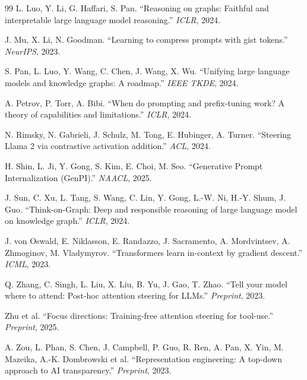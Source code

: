 \documentclass[11pt]{article}
\theoremstyle{definition}
\begin{document}
\begin{thebibliography}{99}
L. Luo, Y. Li, G. Haffari, S. Pan.
``Reasoning on graphs: Faithful and interpretable large language model reasoning.''
\emph{ICLR}, 2024.

J. Mu, X. Li, N. Goodman.
``Learning to compress prompts with gist tokens.''
\emph{NeurIPS}, 2023.

S. Pan, L. Luo, Y. Wang, C. Chen, J. Wang, X. Wu.
``Unifying large language models and knowledge graphs: A roadmap.''
\emph{IEEE TKDE}, 2024.

A. Petrov, P. Torr, A. Bibi.
``When do prompting and prefix-tuning work? A theory of capabilities and limitations.''
\emph{ICLR}, 2024.

N. Rimsky, N. Gabrieli, J. Schulz, M. Tong, E. Hubinger, A. Turner.
``Steering Llama 2 via contrastive activation addition.''
\emph{ACL}, 2024.

H. Shin, L. Ji, Y. Gong, S. Kim, E. Choi, M. Seo.
``Generative Prompt Internalization (GenPI).''
\emph{NAACL}, 2025.

J. Sun, C. Xu, L. Tang, S. Wang, C. Lin, Y. Gong, L.-W. Ni, H.-Y. Shum, J. Guo.
``Think-on-Graph: Deep and responsible reasoning of large language model on knowledge graph.''
\emph{ICLR}, 2024.

J. von Oswald, E. Niklasson, E. Randazzo, J. Sacramento, A. Mordvintsev, A. Zhmoginov, M. Vladymyrov.
``Transformers learn in-context by gradient descent.''
\emph{ICML}, 2023.

Q. Zhang, C. Singh, L. Liu, X. Liu, B. Yu, J. Gao, T. Zhao.
``Tell your model where to attend: Post-hoc attention steering for LLMs.''
\emph{Preprint}, 2023.

Zhu et al.
``Focus directions: Training-free attention steering for tool-use.''
\emph{Preprint}, 2025.

A. Zou, L. Phan, S. Chen, J. Campbell, P. Guo, R. Ren, A. Pan, X. Yin, M. Mazeika, A.-K. Dombrowski et al.
``Representation engineering: A top-down approach to AI transparency.''
\emph{Preprint}, 2023.

\end{thebibliography}
\end{document}
